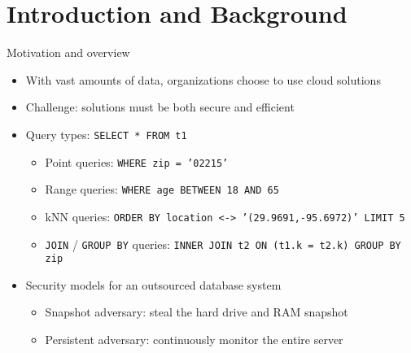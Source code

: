 \section{Introduction and Background}

	\begin{frame}{Motivation and overview}

		\begin{itemize}
			\item<1-> With vast amounts of data, organizations choose to use cloud solutions
			\item<1-> \alert{Challenge:} solutions must be both secure and efficient
			\item<2-> Query types: \texttt{SELECT * FROM t1 }
				\begin{itemize}
					\item<1,2,6-> Point queries: \texttt{WHERE zip = '02215'}
					\item<1,3,6-> Range queries: \texttt{WHERE age BETWEEN 18 AND 65}
					\item<1,4,6-> kNN queries: \texttt{ORDER BY location <-> '(29.9691,-95.6972)' LIMIT 5} %
					\item<1,5,6-> \texttt{JOIN} / \texttt{GROUP BY} queries: \texttt{INNER JOIN t2 ON (t1.k = t2.k) GROUP BY zip}
				\end{itemize}
			\item<6-> Security models for an outsourced database system
				\begin{itemize}
					\item<1-5,7> Snapshot adversary: steal the hard drive and RAM snapshot %
					\item<1-5,8> Persistent adversary: continuously monitor the entire server %
				\end{itemize}
		\end{itemize}

	\end{frame}

